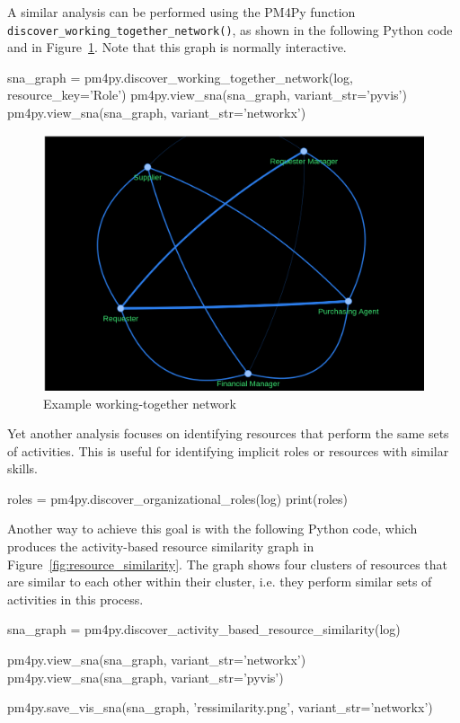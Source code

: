 A similar analysis can be performed using the PM4Py function \\ \texttt{discover\_working\_together\_network()}, as shown in the following Python code and in Figure~\ref{fig:workingtogether}. Note that this graph is normally interactive.

\begin{samepage}
\begin{pythoncode}
sna_graph = pm4py.discover_working_together_network(log,
   resource_key='Role')
pm4py.view_sna(sna_graph, variant_str='pyvis')   
pm4py.view_sna(sna_graph, variant_str='networkx')   
\end{pythoncode}
\end{samepage}

\begin{figure}
\centering
\includegraphics[width=.66\textwidth]{screen4.png}
\caption{Example working-together network}
\label{fig:workingtogether}
\end{figure}

Yet another analysis focuses on identifying resources that perform the same sets of activities. This is useful for identifying implicit roles or resources with similar skills.

\begin{samepage}
\begin{pythoncode}
roles = pm4py.discover_organizational_roles(log)
print(roles)
\end{pythoncode}
\end{samepage}

Another way to achieve this goal is with the following Python code, which produces the activity-based resource similarity graph in Figure~\ref{fig:resource_similarity}. The graph shows four clusters of resources that are similar to each other within their cluster, i.e. they perform similar sets of activities in this process. 

\begin{samepage}
\begin{pythoncode}
sna_graph = pm4py.discover_activity_based_resource_similarity(log)

pm4py.view_sna(sna_graph, variant_str='networkx')
pm4py.view_sna(sna_graph, variant_str='pyvis')

pm4py.save_vis_sna(sna_graph, 'ressimilarity.png',
    variant_str='networkx')
\end{pythoncode}
\end{samepage}

